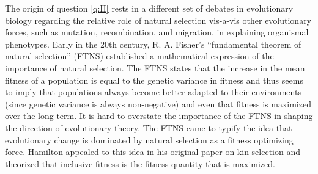 \documentclass[11pt]{article}
\begin{document}
The origin of question \ref{q:II} rests in a different set of debates in evolutionary biology regarding the relative role of natural selection vis-a-vis other evolutionary forces, such as mutation, recombination, and migration, in explaining organismal phenotypes. Early in the 20th century, R. A. Fisher's ``fundamental theorem of natural selection'' (FTNS) \cite{Fisher:1930} established a mathematical expression of the importance of natural selection. The FTNS states that the increase in the mean fitness of a population is equal to the genetic variance in fitness and thus seems to imply that populations always become better adapted to their environments (since genetic variance is always non-negative) and even that fitness is maximized over the long term. It is hard to overstate the importance of the FTNS in shaping the direction of evolutionary theory. The FTNS came to typify the idea that evolutionary change is dominated by natural selection as a fitness optimizing force. Hamilton appealed to this idea in his original paper on kin selection \cite{Hamilton:1964} and theorized that inclusive fitness is the fitness quantity that is maximized.
\end{document}
